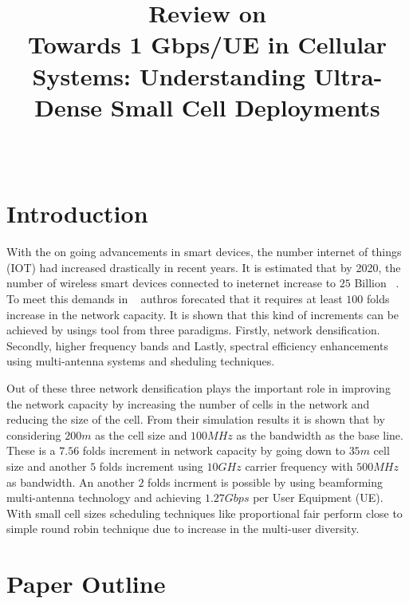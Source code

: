 \documentclass[12pt,onecolumn]{IEEEtran}
\begin{document}
\title{Review on \\ Towards 1 Gbps/UE in Cellular Systems: Understanding Ultra-Dense Small Cell Deployments}
\author{\\
}
\maketitle



\section{Introduction}
\label{sec:intro}

With the on going advancements in smart devices, the number internet of things (IOT) had increased drastically in recent years. It is estimated that by 2020, the number of wireless smart devices connected to ineternet increase to $25$ Billion ~\cite{Gartner}. To meet this demands in ~\cite{main_paper} authros forecated that it requires at least $100$ folds increase in the network capacity. It is shown that this kind of increments can be achieved by usings tool from three paradigms. Firstly, network densification. Secondly, higher frequency bands and Lastly, spectral efficiency enhancements using multi-antenna systems and sheduling techniques. 

Out of these three network densification plays the important role in improving the network capacity by increasing the number of cells in the network and reducing the size of the cell. From their simulation results it is shown that by considering $200m$ as the cell size and $100MHz$ as the bandwidth as the base line. These is a $7.56$ folds increment in network capacity by going down to $35m$ cell size and another $5$ folds increment using $10GHz$ carrier frequency with $500MHz$ as bandwidth. An another $2$ folds incrment is possible by using beamforming multi-antenna technology and achieving $1.27Gbps$ per User Equipment (UE). With small cell sizes scheduling techniques like proportional fair perform close to simple round robin technique due to increase in the multi-user diversity.

\section{Paper Outline}
\label{sec:PO}
\end{document}

